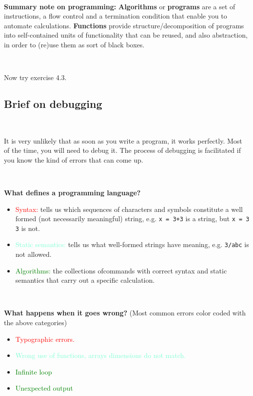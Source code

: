 \documentclass[11pt]{amsart}
\begin{document}
\

{\bf Summary note on programming:} {\bf Algorithms} or {\bf programs} are a set of instructions, a flow control and a termination condition that enable you to automate calculations. {\bf Functions} provide structure/decomposition of programs into self-contained units of functionality that can be reused, and also abstraction, in order to (re)use them as sort of black boxes. 

\

Now try exercise 4.3.

\subsection{Brief on debugging}

\

It is very unlikely that as soon as you write a program, it works perfectly. Most of the time, you will need to debug it. The process of debugging is facilitated if you know the kind of errors that can come up.

\

{\bf What defines a programming language?} 
\begin{itemize}
\item \textcolor[named]{Red}{Syntax:} tells us which sequences of characters and symbols constitute a well formed (not necessarily meaningful) string, e.g. \verb-x = 3+3- is a string, but \verb+x = 3   3+ is not. 
\item  \textcolor[named]{Aquamarine}{Static semantics:} tells us what well-formed strings have meaning, e.g. \verb+3/abc+ is not allowed.
\item \textcolor[named]{Green}{Algorithms:} the collections ofcommands with correct syntax and static semantics that carry out a specific calculation.
\end{itemize}

\

{\bf What happens when it goes wrong?} (Most common errors color coded with the above categories)
\begin{itemize}
\item \textcolor[named]{Red}{Typographic errors.}
\item \textcolor[named]{Aquamarine}{Wrong use of functions, arrays dimensions do not match.}
\item \textcolor[named]{Green}{Infinite loop}
\item \textcolor[named]{Green}{Unexpected output}
\end{itemize}
\end{document}
